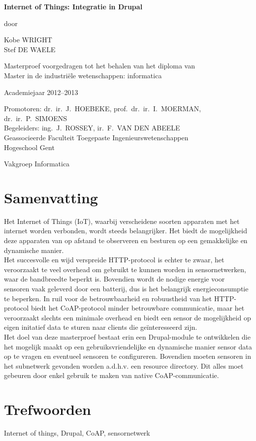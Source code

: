 
\newpage

{
\setlength{\baselineskip}{14pt}
\setlength{\parindent}{0pt}
\setlength{\parskip}{8pt}

\begin{center}

\noindent \textbf{\huge
Internet of Things: Integratie in Drupal
}

door 

Kobe WRIGHT\\
Stef DE WAELE

Masterproef voorgedragen tot het behalen van het diploma van\\
Master in de industri\"{e}le wetenschappen: informatica

Academiejaar 2012--2013

Promotoren: dr.~ir.~J.~HOEBEKE, prof.~dr.~ir.~I.~MOERMAN, dr.~ir.~P.~SIMOENS\\
Begeleiders: ing.~J.~ROSSEY, ir.~F.~VAN DEN ABEELE\\

Geassocieerde Faculteit Toegepaste Ingenieurswetenschappen\\
Hogeschool Gent

Vakgroep Informatica

\end{center}

\section*{Samenvatting}


Het Internet of Things (IoT), waarbij verscheidene soorten apparaten met het internet worden verbonden, wordt steeds belangrijker. Het biedt de mogelijkheid deze apparaten van op afstand te observeren en besturen op een gemakkelijke en dynamische manier.\\
Het succesvolle en wijd verspreide HTTP-protocol is echter te zwaar, het veroorzaakt te veel overhead om gebruikt te kunnen worden in sensornetwerken, waar de bandbreedte beperkt is. Bovendien wordt de nodige energie voor sensoren vaak geleverd door een batterij, dus is het belangrijk energieconsumptie te beperken. In ruil voor de betrouwbaarheid en robuustheid van het HTTP-protocol biedt het CoAP-protocol minder betrouwbare communicatie, maar het veroorzaakt slechts een minimale overhead en biedt een sensor de mogelijkheid op eigen initatief data te sturen naar clients die ge\"{i}nteresseerd zijn.\\
Het doel van deze masterproef bestaat erin een Drupal-module te ontwikkelen die het mogelijk maakt op een gebruiksvriendelijke en dynamische manier sensor data op te vragen en eventueel sensoren te configureren. Bovendien moeten sensoren in het subnetwerk gevonden worden a.d.h.v. een resource directory. Dit alles moet gebeuren door enkel gebruik te maken van native CoAP-communicatie. 


\section*{Trefwoorden}


Internet of things, Drupal, CoAP, sensornetwerk

}

\newpage %
